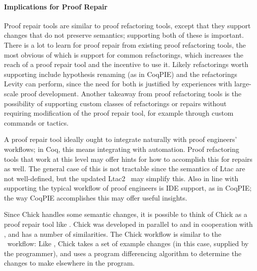 \paragraph{Implications for Proof Repair}

Proof repair tools are similar to proof refactoring tools,
except that they support changes that do not preserve semantics; supporting
both of these is important. There is a lot to learn for proof repair from existing proof refactoring tools,
the most obvious of which is support for common
refactorings, which increases the reach of a proof repair tool and the incentive to use it.
Likely refactorings worth supporting include hypothesis renaming (as in CoqPIE) and the refactorings Levity can perform, since
the need for both is justified by experiences with large-scale proof development.
Another takeaway from proof refactoring tools is the possibility of supporting custom classes of refactorings or
repairs without requiring modification of the proof repair tool,
for example through custom commands or tactics.

A proof repair tool ideally ought to integrate naturally with proof engineers' workflows;
in Coq, this means integrating with automation.
Proof refactoring tools that work at this level may offer hints for how to accomplish this for repairs as well.
The general case of this is not tractable since the semantics of Ltac are not well-defined,
but the updated Ltac2~\cite{ltac2}
may simplify this.
Also in line with supporting the typical workflow of proof engineers is IDE support,
as in CoqPIE; the way CoqPIE accomplishes this %
may offer useful insights.

Since Chick handles some semantic changes, it is possible to think of Chick as a proof repair tool like \sysname.
Chick was developed in parallel to and in cooperation with \sysname, and has a number of similarities.
The Chick workflow is similar to the \sysname\ workflow:
Like \sysname, Chick takes a set of example changes (in this case, supplied by the programmer),
and uses a program differencing algorithm to determine the changes to make elsewhere in the program.

